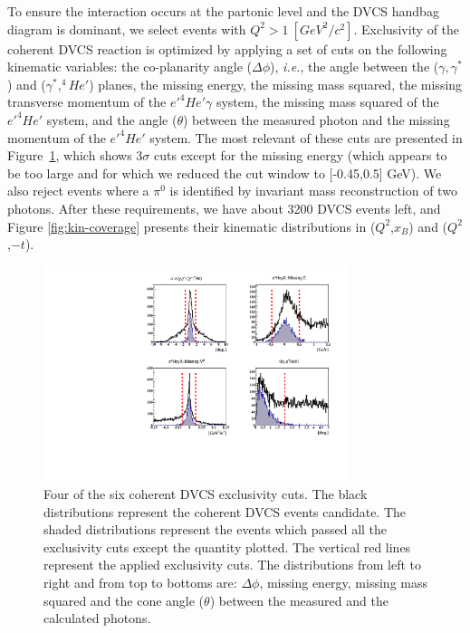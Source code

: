 \documentclass[twocolumn,nofootinbib,showpacs,prl,superscriptaddress,secnumarabic,amssymb,nobibnotes,aps,floatfix]{revtex4}
\begin{document}
To ensure the interaction occurs at the partonic level and the DVCS handbag 
diagram is dominant, we select events with $Q^{2}>1~[GeV^{2}/c^{2}]$.  
Exclusivity of the coherent DVCS reaction is optimized by applying a set of 
cuts on the following kinematic variables: the co-planarity angle ($\Delta 
\phi$), \textit{i.e.}, the angle between the ($\gamma,\gamma^*$) and 
($\gamma^*,^4He'$) planes, the missing energy, the missing mass squared, the 
missing transverse momentum of the $e'^4He'\gamma$ system, the missing mass 
squared of the $e'^4He'$ system, and the angle ($\theta$) between the measured 
photon and the missing momentum of the $e'^4He'$ system. The most relevant of 
these cuts are presented in Figure~\ref{fig:kin-cuts}, which shows 3$\sigma$ 
cuts except for the missing energy (which appears to be too large and for which 
we reduced the cut window to [-0.45,0.5] GeV).  We also reject events where a 
$\pi^0$ is identified by invariant mass reconstruction of two photons.  After 
these requirements, we have about 3200 DVCS events left, and Figure 
\ref{fig:kin-coverage} presents their kinematic distributions in 
($Q^{2}$,$x_{B}$) and ($Q^{2}$,$-t$).

\begin{figure}[tb]
\includegraphics[width=8.9cm]{figs/coh_exc_cuts.pdf}
\caption{Four of the six coherent DVCS exclusivity cuts. The black 
distributions represent the coherent DVCS events candidate. The shaded 
distributions represent the events which passed all the exclusivity cuts except 
the quantity plotted. The vertical red lines represent the applied exclusivity 
cuts. The distributions from left to right and from top to bottoms are: $\Delta 
\phi$, missing energy, missing mass squared and the cone angle ($\theta$) 
between the measured and the calculated photons.}
\label{fig:kin-cuts}
\end{figure}
 
\end{document}
